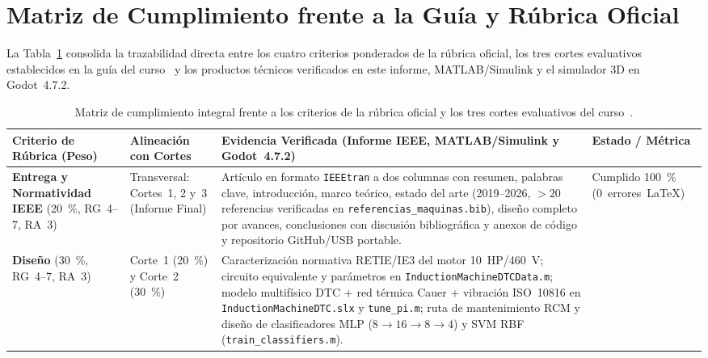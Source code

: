 \section{Matriz de Cumplimiento frente a la Gu\'ia y R\'ubrica Oficial}\label{app:qa}

La Tabla~\ref{tab:cumplimiento_guia} consolida la trazabilidad directa entre
los cuatro criterios ponderados de la r\'ubrica oficial, los tres cortes
evaluativos establecidos en la gu\'ia del curso~\cite{GuiaProyecto2026} y los
productos t\'ecnicos verificados en este informe, MATLAB/Simulink y el
simulador 3D en Godot~4.7.2.

\begin{table}[t]
\centering
\footnotesize
\setlength{\tabcolsep}{4pt}
\renewcommand{\arraystretch}{1.12}
\caption{Matriz de cumplimiento integral frente a los criterios de la r\'ubrica oficial y los tres cortes evaluativos del curso~\cite{GuiaProyecto2026}.}
\label{tab:cumplimiento_guia}
\begin{tabularx}{\textwidth}{@{} >{\raggedright\arraybackslash}p{2.85cm} >{\raggedright\arraybackslash}p{2.55cm} >{\raggedright\arraybackslash}X >{\raggedright\arraybackslash}p{2.45cm} @{}}
\toprule
\textbf{Criterio de R\'ubrica (Peso)} & \textbf{Alineaci\'on con Cortes} & \textbf{Evidencia Verificada (Informe IEEE, MATLAB/Simulink y Godot~4.7.2)} & \textbf{Estado / M\'etrica} \\
\midrule
\textbf{Entrega y Normatividad IEEE} (\qty{20}{\percent}, RG~4--7, RA~3) &
Transversal: Cortes~1, 2 y~3 (Informe Final) &
Art\'iculo en formato \texttt{IEEEtran} a dos columnas con resumen, palabras clave, introducci\'on, marco te\'orico, estado del arte (2019--2026, $>20$ referencias verificadas en \texttt{referencias\_\allowbreak maquinas.bib}), dise\~no completo por avances, conclusiones con discusi\'on bibliogr\'afica y anexos de c\'odigo y repositorio GitHub/USB portable. &
Cumplido \qty{100}{\percent} (0~errores~\LaTeX) \\
\midrule
\textbf{Dise\~no} (\qty{30}{\percent}, RG~4--7, RA~3) &
Corte~1 (\qty{20}{\percent}) y Corte~2 (\qty{30}{\percent}) &
Caracterizaci\'on normativa RETIE/IE3 del motor \qty{10}{HP}/\qty{460}{\volt}; circuito equivalente y par\'ametros en \texttt{InductionMachineDTCData.m}; modelo multif\'isico DTC + red t\'ermica Cauer + vibraci\'on ISO~10816 en \texttt{InductionMachineDTC.slx} y \texttt{tune\_\allowbreak pi.m}; ruta de mantenimiento RCM y dise\~no de clasificadores MLP ($8\to 16\to 8\to 4$) y SVM RBF (\texttt{train\_\allowbreak classifiers.m}). &

\end{tabularx}
\end{table}

